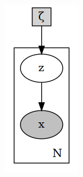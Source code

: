 \documentclass[11pt, a4paper]{report}
\theoremstyle{plain}
\theoremstyle{definition}
\theoremstyle{remark}
\begin{document}
\begin{figure}[h]
\centering
\begin{subfigure}[b]{0.2\textwidth}
\includegraphics[width=\textwidth]{plots/vae_p.gv.png}

\end{subfigure}
\end{figure}
\end{document}
